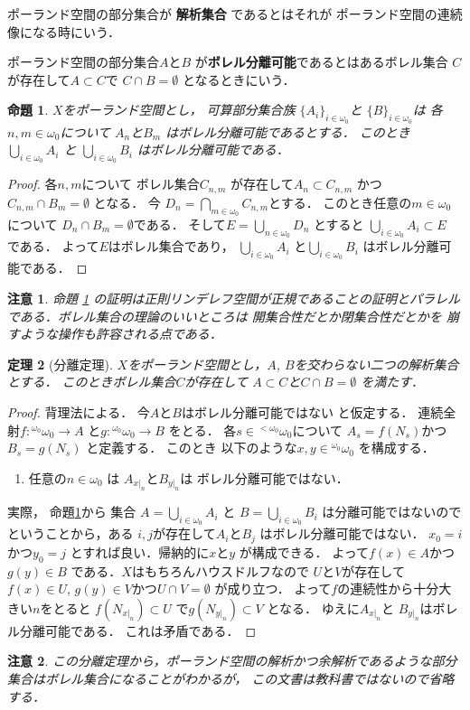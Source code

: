 \documentclass[leqno, 12pt]{jsarticle}
\newtheorem{thm}{定理}
\newtheorem{prop}[thm]{命題}
\newtheorem*{rmk}{注意}
\newcommand{\myomega}{\omega_{0}}
\newcommand{\mybairetb}{{}^{<\myomega}\myomega}
\newcommand{\mybaire}{{}^{\myomega}\myomega}
\newcommand{\mynbd}[1]{N_{#1}}
\begin{document}
ポーランド空間の部分集合が
\textbf{解析集合}
であるとはそれが
ポーランド空間の連続像になる時にいう．

ポーランド空間の部分集合$A$と$B$
が\textbf{ボレル分離可能}であるとはあるボレル集合
$C$が存在して$A\subset C$で
$C\cap B=\emptyset$
となるときにいう．
\begin{prop}\label{prop:bsep}
$X$をポーランド空間とし，
可算部分集合族
$\{A_{i}\}_{i\in \myomega}$と
$\{B\}_{i\in \myomega}$は
各$n, m\in \myomega$について
$A_{n}$と$B_{m}$
はボレル分離可能であるとする．
このとき
$\bigcup_{i\in \myomega}A_{i}$
と
$\bigcup_{i\in \myomega}B_{i}$
はボレル分離可能である．
\end{prop}
\begin{proof}
各$n, m$について
ボレル集合$C_{n, m}$
が存在して$A_{n}\subset C_{n, m}$
かつ$C_{n, m}\cap B_{m}=\emptyset$
となる．
今
$D_{n}=\bigcap_{m\in \myomega}C_{n, m}$とする．
このとき任意の$m\in \myomega$について
$D_{n}\cap B_{m}=\emptyset$である．
そして$E=\bigcup_{n\in \myomega}D_{n}$
とすると
$\bigcup_{i\in \myomega}A_{i}\subset E$
である．
よって$E$はボレル集合であり，
$\bigcup_{i\in \myomega}A_{i}$
と$\bigcup_{i\in \myomega}B_{i}$
はボレル分離可能である．
\end{proof}
\begin{rmk}
命題 \ref{prop:bsep}
の証明は正則リンデレフ空間が正規であることの証明とパラレルである．ボレル集合の理論のいいところは
開集合性だとか閉集合性だとかを
崩すような操作も許容される点である．
\end{rmk}

\begin{thm}[分離定理]\label{thm:bsepp}
$X$をポーランド空間とし，$A$, 
$B$を交わらない二つの解析集合とする．
このときボレル集合$C$が存在して
$A\subset C$と$C\cap B=\emptyset$
を満たす．
\end{thm}
\begin{proof}
背理法による．
今$A$と$B$はボレル分離可能ではない
と仮定する．
連続全射$f\colon \mybaire\to A$
と$g\colon \mybaire \to B$
をとる．
各$s\in \mybairetb$について
$A_{s}=f(\mynbd{s})$かつ
$B_{s}=g(\mynbd{s})$
と定義する．
このとき
以下のような$x, y\in \mybaire$
を構成する．
\begin{enumerate}
\item 
任意の$n\in \myomega$
は
$A_{x|_{n}}$と$B_{y|_{n}}$は
ボレル分離可能ではない．
\end{enumerate}
実際，
命題\ref{prop:bsep}から
集合
$A=\bigcup_{i\in \myomega}A_{i}$
と
$B=\bigcup_{i\in \myomega}B_{i}$
は分離可能ではないのでということから，ある
$i, j$が存在して$A_{i}$と$B_{j}$
はボレル分離可能ではない．
$x_{0}=i$かつ$y_{0}=j$
とすれば良い．帰納的に$x$と$y$
が構成できる．
よって$f(x)\in A$かつ$g(y)\in B$
である．$X$はもちろんハウスドルフなので
$U$と$V$が存在して$f(x)\in U$, 
$g(y)\in V$かつ$U\cap V=\emptyset$
が成り立つ．
よって$f$の連続性から十分大きい$n$をとると
$f(N_{x|_{n}})\subset U$
で$g(N_{y|_{n}})\subset V$
となる．
ゆえに$A_{x|_{n}}$と
$B_{y|_{n}}$はボレル分離可能である．
これは矛盾である．
\end{proof}
\begin{rmk}
この分離定理から，ポーランド空間の解析かつ余解析であるような部分
集合はボレル集合になることがわかるが，
この文書は教科書ではないので省略する．
\end{rmk}
\end{document}

